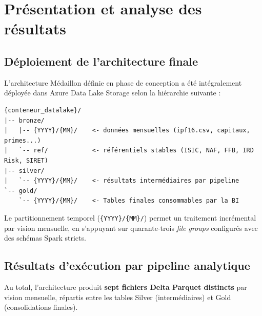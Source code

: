 \chapter{Présentation et analyse des résultats}

\section{Déploiement de l'architecture finale}

L'architecture Médaillon définie en phase de conception a été intégralement
déployée dans Azure Data Lake Storage selon la hiérarchie suivante :

\begin{verbatim}
{conteneur_datalake}/
|-- bronze/
|   |-- {YYYY}/{MM}/    <- données mensuelles (ipf16.csv, capitaux, primes...)
|   `-- ref/            <- référentiels stables (ISIC, NAF, FFB, IRD Risk, SIRET)
|-- silver/
|   `-- {YYYY}/{MM}/    <- résultats intermédiaires par pipeline
`-- gold/
    `-- {YYYY}/{MM}/    <- Tables finales consommables par la BI
\end{verbatim}

Le partitionnement temporel (\texttt{\{YYYY\}/\{MM\}/}) permet un traitement
incrémental par vision mensuelle, en s'appuyant sur quarante-trois
\textit{file groups} configurés avec des schémas Spark stricts.

\section{Résultats d'exécution par pipeline analytique}

Au total, l'architecture produit \textbf{sept fichiers Delta Parquet distincts} par
vision mensuelle, répartis entre les tables Silver (intermédiaires) et Gold
(consolidations finales).

